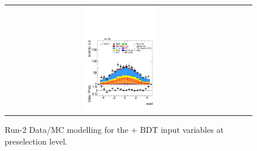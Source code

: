 \begin{figure}[htbp]
\begin{tabular}{@{}c c c@{}}
    \includegraphics[width=0.33\textwidth]{images/plots_modelling_run2_run3_variables/run_2_tth/plot_eta4_hh_tth_15_16_17_18.pdf}
  \end{tabular}

  \caption{Run-2 Data/MC modelling for the \thqb + \ttH BDT input variables at preselection level.}
  \label{tth_vars_modelling_run3_1}
\end{figure}

